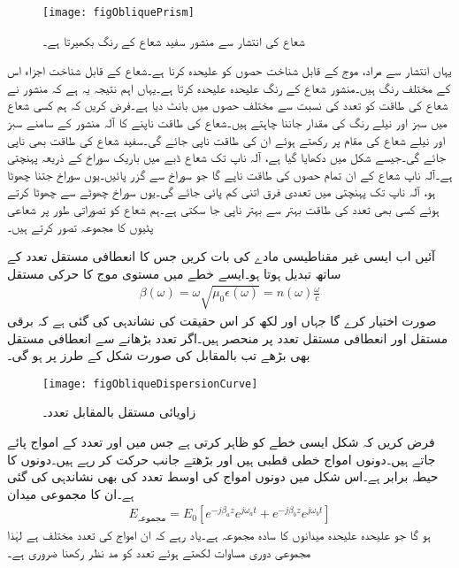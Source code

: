 \begin{figure}
\centering
\texttt{[image: figObliquePrism]}
\caption{شعاع کی انتشار سے منشور سفید شعاع کے رنگ بکھیرتا ہے۔}
\label{شکل_ترچھی_انتشار_بذریعہ_منشور}
\end{figure}
یہاں انتشار سے مراد، موج کے قابل شناخت حصوں کو علیحدہ کرنا ہے۔شعاع کے قابل شناخت اجزاء اس کے مختلف رنگ ہیں۔منشور شعاع کے رنگ علیحدہ علیحدہ کرتا ہے۔یہاں اہم نتیجہ یہ ہے کہ منشور نے شعاع کی طاقت کو تعدد کی نسبت سے مختلف حصوں میں بانٹ دیا ہے۔فرض کریں کہ ہم کسی شعاع میں سبز اور نیلے رنگ کی مقدار جاننا چاہتے ہیں۔شعاع کی طاقت ناپنے کا آلہ منشور کے سامنے سبز اور نیلے شعاع کی مقام پر رکھتے ہوئے ان کی طاقت ناپی جائے گی۔سفید شعاع کی طاقت بھی ناپی جائے گی۔جیسے شکل میں دکھایا گیا ہے، آلہ ناپ تک شعاع ڈبے میں باریک سوراخ کے ذریعہ پہنچتی ہے۔آلہ ناپ شعاع کے ان تمام حصوں کی طاقت ناپے گا جو سوراخ سے گزر پائیں۔یوں سوراخ جتنا چھوٹا ہو، آلہ ناپ تک پہنچتی  میں تعددی فرق اتنی کم پائی جائے گی۔یوں سوراخ چھوٹے سے چھوٹا کرتے ہوئے کسی بھی تعدد کی طاقت بہتر سے بہتر ناپی جا سکتی ہے۔ہم شعاع کو تصوراتی طور پر شعاعی پٹیوں کا مجموعہ تصور کرتے ہیں۔

آئیں اب ایسی غیر مقناطیسی مادے کی بات کریں جس کا انعطافی مستقل تعدد کے ساتھ تبدیل ہوتا ہو۔ایسے خطے میں مستوی موج کا حرکی مستقل
\begin{align}
\beta(\omega)=\omega\sqrt{\mu_0 \epsilon\left(\omega\right)}=n(\omega)\frac{\omega}{c}
\end{align}
صورت اختیار کرے گا جہاں  اور  لکھ کر اس حقیقت کی نشاندہی کی گئی ہے کہ برقی مستقل اور انعطافی مستقل تعدد پر منحصر ہیں۔اگر تعدد بڑھانے سے انعطافی مستقل  بھی بڑھے تب  بالمقابل  کی صورت شکل  کے طرز پر ہو گی۔
\begin{figure}
\centering
\texttt{[image: figObliqueDispersionCurve]}
\caption{زاویائی مستقل بالمقابل تعدد۔}
\label{شکل_ترچھی_حرکی_مستقل_بالمقابل_تعدد_خط}
\end{figure}

فرض کریں کہ شکل  ایسی خطے کو ظاہر کرتی ہے جس میں  اور  تعدد کے امواج پائے جاتے ہیں۔دونوں  امواج  خطی قطبی ہیں اور بڑھتے  جانب حرکت کر رہے ہیں۔دونوں کا حیطہ برابر ہے۔اس شکل میں دونوں امواج کی اوسط تعدد  کی بھی نشاندہی کی گئی ہے۔ان کا مجموعی میدان
\begin{align}\label{مساوات_ترچھی_انتشار_الف}
E_{\text{مجموعہ}}=E_0\left[e^{-j \beta_a z}e^{j \omega_a t}+e^{-j \beta_b z}e^{j \omega_b t}\right]
\end{align}
ہو گا جو علیحدہ علیحدہ میدانوں کا سادہ مجموعہ ہے۔یاد رہے کہ ان امواج کی تعدد مختلف ہے لہٰذا مجموعی دوری مساوات لکھتے ہوئے تعدد کو مد نظر رکھنا ضروری ہے۔

